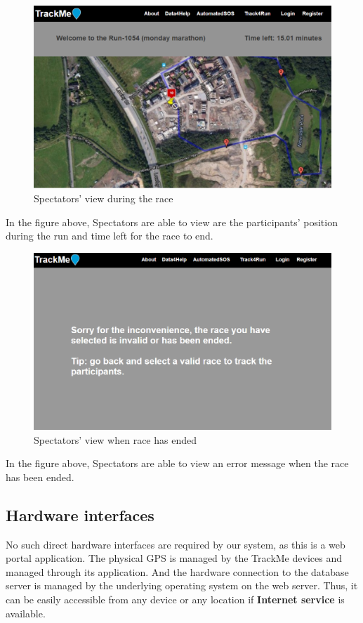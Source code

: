 \documentclass[a4paper, hidelinks, 12pt]{report}
\begin{document}
	\begin{figure}[H]
		\centering
		\includegraphics[scale=0.35]{../Assets/spectators_valid_race.png}\caption[UI: Spectators' view during the race]{Spectators' view during the race}
		\label{fig:Make_Request}
	\end{figure}
	In the figure above, Spectators are able to view are the participants' position during the run and time left for the race to end. 
	\begin{figure}[H]
		\centering
		\includegraphics[scale=0.35]{../Assets/spectators_invalid_race.png}\caption[UI: Spectators' view when race has ended]{Spectators' view when race has ended}
		\label{fig:Make_Request}
	\end{figure}
	In the figure above, Spectators are able to view an error message when the race has been ended. 

	\subsection{Hardware interfaces}
	No such direct hardware interfaces are required by our system, as this is a web portal application. The physical GPS is managed by the TrackMe devices and managed through its application. And the hardware connection to the database server is managed by the underlying operating system on the web server. Thus, it can be easily accessible from any device or any location if \textbf{Internet service} is available.
	
\end{document}
